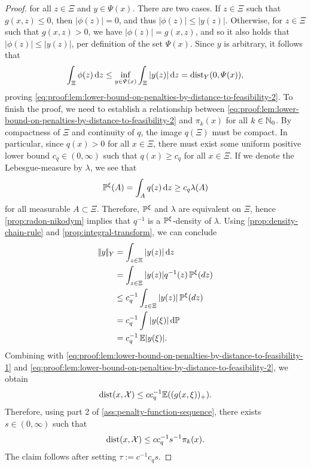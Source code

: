 \begin{proof}
    for all $z\in \Xi$ and $y\in\Psi(x)$.
    There are two cases. If $z\in\Xi$ such that $g(x, z) \leq 0$,
    then $|\phi(z)| = 0$, and thus $|\phi(z)| \leq |y(z)|$. Otherwise, for $z\in\Xi$ such that $g(x,z) > 0$,
    we have $|\phi(z)| = g(x, z)$, and so it also holds that $|\phi(z)| \leq |y(z)|$, per definition
    of the set $\varPsi(x)$.
    Since $y$ is arbitrary, it follows that
    \[
        \int_{\Xi} \phi(z) \, \text{d}z
        \leq
        \inf_{y \in \varPsi(x)} \int_{\Xi} |y(z)| \, \text{d}z
        =
        \operatorname{dist}_Y(0, \varPsi(x)),
    \]
    proving \eqref{eq:proof:lem:lower-bound-on-penalties-by-distance-to-feasibility-2}.
    To finish the proof, we need to establish a relationship between
    \eqref{eq:proof:lem:lower-bound-on-penalties-by-distance-to-feasibility-2}
    and $\pi_k(x)$ for all $k\in\mathbb{N}_0$.
    By compactness of $\Xi$ and continuity of $q$, the image $q(\Xi)$
    must be compact.
    In particular, since $q(x) > 0$ for all $x\in \Xi$, there must
    exist some uniform positive lower bound $c_q \in (0, \infty)$ such that $q(x) \geq c_q$
    for all $x\in \Xi$. If we denote the Lebesgue-measure by $\lambda$, we see that
    \[
        \mathbb{P}^\xi(A) = \int_{A} q(z) \, \text{d}z \geq c_q \lambda (A)
    \]
    for all measurable $A \subset \Xi$.
    Therefore, $\mathbb{P}^\xi$ and $\lambda$ are equivalent on $\Xi$, hence \cref{prop:radon-nikodym}
    implies that $q^{-1}$ is a $\mathbb{P}^\xi$-density of $\lambda$.
    Using \cref{prop:density-chain-rule} and \cref{prop:integral-transform}, we can conclude
    \begin{align*}
        |\!|y|\!|_Y &= \int_{z\in \Xi} | y(z) | \, \text{d}z \\
        &= \int_{z\in \Xi} | y(z) | q^{-1}(z) \, \mathbb{P}^\xi(dz) \\
        &\leq c_q^{-1} \int_{z\in \Xi} | y(z) | \, \mathbb{P}^\xi(dz) \\
        &= c_q^{-1} \int | y(\xi) |\, \text{d}\mathbb{P} \\
        &= c_q^{-1} \, \mathbb{E}|y(\xi)|.
    \end{align*}
    Combining with \eqref{eq:proof:lem:lower-bound-on-penalties-by-distance-to-feasibility-1}
    and \eqref{eq:proof:lem:lower-bound-on-penalties-by-distance-to-feasibility-2}, we
    obtain
    \[
        \operatorname{dist}(x, \mathcal{X}) \leq c c_q^{-1} \mathbb{E}((g(x, \xi))_+).
    \]
    Therefore, using part 2 of \cref{ass:penalty-function-sequence}, there exists $s\in(0,\infty)$ such that
    \[
        \operatorname{dist}(x, \mathcal{X}) \leq c c_q^{-1} s^{-1} \pi_k(x).
    \]
    The claim follows after setting $\tau := c^{-1} c_q s$.
\end{proof}


